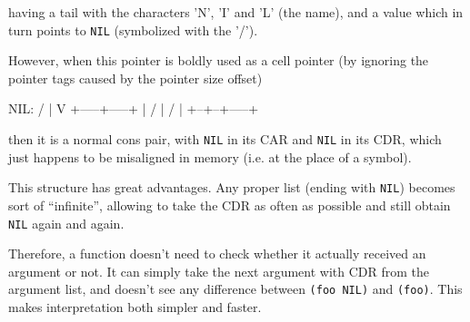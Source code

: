 having a tail with the characters 'N', 'I' and 'L' (the name), and a
value which in turn points to \texttt{NIL} (symbolized with the '/').

However, when this pointer is boldly used as a cell pointer (by
ignoring the pointer tags caused by the pointer size offset)

\begin{wideverbatim}
      NIL:  /
            |
            V
            +-----+-----+
            |  /  |  /  |
            +--+--+-----+
\end{wideverbatim}

then it is a normal cons pair, with \texttt{NIL} in its CAR and
\texttt{NIL} in its CDR, which just happens to be misaligned in memory
(i.e. at the place of a symbol).

This structure has great advantages. Any proper list (ending with
\texttt{NIL}) becomes sort of ``infinite'', allowing to take the CDR
as often as possible and still obtain \texttt{NIL} again and again.

Therefore, a function doesn't need to check whether it actually
received an argument or not. It can simply take the next argument with
CDR from the argument list, and doesn't see any difference between
\texttt{(foo NIL)} and \texttt{(foo)}. This makes interpretation both
simpler and faster.


